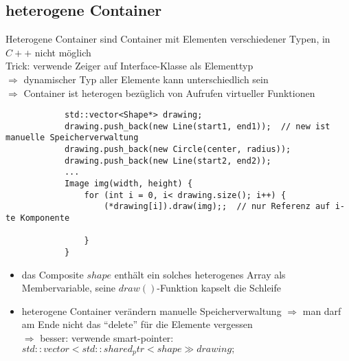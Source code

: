 \documentclass{article}
\begin{document}
	\subsection*{heterogene Container}
		Heterogene Container sind Container mit Elementen verschiedener Typen, in $C++$ nicht möglich \\ Trick: verwende Zeiger auf Interface-Klasse als Elementtyp \\$\Rightarrow $ dynamischer Typ aller Elemente kann unterschiedlich sein \\
		$\Rightarrow $ Container ist heterogen bezüglich von Aufrufen virtueller Funktionen
		\begin{lstlisting}
			std::vector<Shape*> drawing;
			drawing.push_back(new Line(start1, end1));  // new ist manuelle Speicherverwaltung
			drawing.push_back(new Circle(center, radius));
			drawing.push_back(new Line(start2, end2));
			...
			Image img(width, height) {
				for (int i = 0, i< drawing.size(); i++) {
					(*drawing[i]).draw(img);;  // nur Referenz auf i-te Komponente

				}
			}
		\end{lstlisting}
		\begin{itemize}
			\item das Composite $shape$ enthält ein solches heterogenes Array als Membervariable, seine $draw()$-Funktion kapselt die Schleife
			\item heterogene Container verändern manuelle Speicherverwaltung $\Rightarrow $ man darf am Ende nicht das ``delete'' für die Elemente vergessen \\
			$\Rightarrow $ besser: verwende smart-pointer: $std::vector<std::shared_ptr<shape\gg drawing;$
		\end{itemize}
\end{document}
